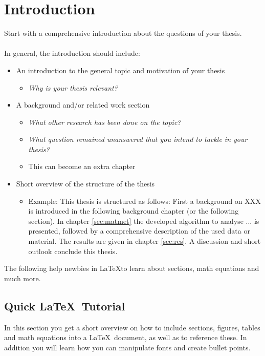 
\chapter{Introduction}
  \label{sec:intro}

Start with a comprehensive introduction about the questions of your thesis.\\\\
In general, the introduction should include:
\begin{itemize}
  \item An introduction to the general topic and motivation of your thesis
  \begin{itemize}
    \item \textit{Why is your thesis relevant?}
  \end{itemize}
  \item A background and/or related work section
  \begin{itemize}
    \item \textit{What other research has been done on the topic?}
    \item \textit{What question remained unanswered that you intend to tackle in your thesis?}
    \item This can become an extra chapter
  \end{itemize}
  \item Short overview of the structure of the thesis
  \begin{itemize}
    \item Example: This thesis is structured as follows: First a background on XXX is introduced in the following background chapter (or the following section). In chapter \ref{sec:matmet} the developed algorithm to analyse ... is presented, followed by a comprehensive description of the used data or material. The results are given in chapter \ref{sec:res}. A discussion and short outlook conclude this thesis.
  \end{itemize}
\end{itemize}
The following help newbies in \LaTeX to learn about sections, math equations and much more.

\section{Quick \LaTeX\ Tutorial}
  \label{sec:latex}
In this section you get a short overview on how to include sections, figures, tables and math equations into a \LaTeX\ document, as well as to reference these. In addition you will learn how you can manipulate fonts and create bullet points.

